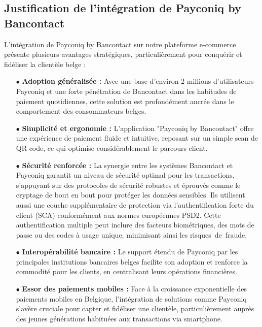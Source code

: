 \subsection{Justification de l'intégration de Payconiq by Bancontact }
L'intégration de Payconiq by Bancontact  sur notre plateforme e-commerce présente plusieurs avantages stratégiques, particulièrement pour conquérir et fidéliser la clientèle belge \cite{Payconic}:
\begin{itemize}
    \item [$\bullet$]\textbf{Adoption généralisée :} Avec une base d'environ 2 millions d'utilisateurs Payconiq et une forte pénétration de Bancontact dans les habitudes de paiement quotidiennes, cette solution est profondément ancrée dans le comportement des consommateurs belges.
    \item [$\bullet$]\textbf{Simplicité et ergonomie :} L'application "Payconiq by Bancontact" offre une expérience de paiement fluide et intuitive, reposant sur un simple scan de QR code, ce qui optimise considérablement le parcours client.
    \item [$\bullet$]\textbf{Sécurité renforcée :} La synergie entre les systèmes Bancontact et Payconiq garantit un niveau
    de sécurité optimal pour les transactions, s’appuyant sur des protocoles de sécurité robustes et éprouvés comme le cryptage de bout en bout pour protéger les données sensibles. Ils utilisent aussi une couche supplémentaire de protection via l'authentification forte du client (SCA) conformément aux normes européennes PSD2. Cette authentification multiple peut inclure des facteurs biométriques, des mots de passe ou des codes à usage unique, minimisant ainsi les risques de fraude.
    \item [$\bullet$]\textbf{Interopérabilité bancaire :} Le support étendu de Payconiq par les principales institutions bancaires belges facilite son adoption et renforce la commodité pour les clients, en centralisant leurs opérations financières.
    \item [$\bullet$]\textbf{Essor des paiements mobiles :} Face à la croissance exponentielle des paiements mobiles en Belgique, l'intégration de solutions comme Payconiq s'avère cruciale pour capter et fidéliser une clientèle, particulièrement auprès des jeunes générations habituées aux transactions via smartphone.
\end{itemize}
